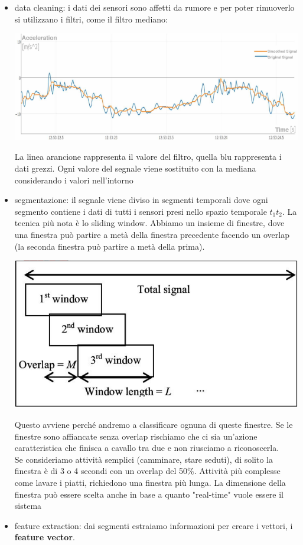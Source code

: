 \begin{itemize}
    \item data cleaning: i dati dei sensori sono affetti da rumore e per poter rimuoverlo si utilizzano i filtri, come il filtro mediano:
    \begin{center}
        \includegraphics[width=\textwidth]{images/MobiDEV/6. activity recognition/data cleaning.PNG}
    \end{center}
    La linea arancione rappresenta il valore del filtro, quella blu rappresenta i dati grezzi. Ogni valore del segnale viene sostituito con la mediana considerando i valori nell'intorno
    \item segmentazione: il segnale viene diviso in segmenti temporali dove ogni segmento contiene i dati di tutti i sensori presi nello spazio temporale $t_1 t_2$. La tecnica più nota è lo sliding window. Abbiamo un insieme di finestre, dove una finestra può partire a metà della finestra precedente facendo un overlap (la seconda finestra può partire a metà della prima). 
    \begin{center}
        \includegraphics[width=.75\textwidth]{images/MobiDEV/6. activity recognition/segmentazione.PNG}    
    \end{center}
    Questo avviene perché andremo a classificare ognuna di queste finestre. Se le finestre sono affiancate senza overlap rischiamo che ci sia un'azione caratteristica che finisca a cavallo tra due e non riusciamo a riconoscerla. 
    \\ Se consideriamo attività semplici (camminare, stare seduti), di solito la finestra è di 3 o 4 secondi con un overlap del 50\%. Attività più complesse come lavare i piatti, richiedono una finestra più lunga. La dimensione della finestra può essere scelta anche in base a quanto "real-time" vuole essere il sistema 
    \item feature extraction: dai segmenti estraiamo informazioni per creare i vettori, i \textbf{feature vector}.
    
\end{itemize}

